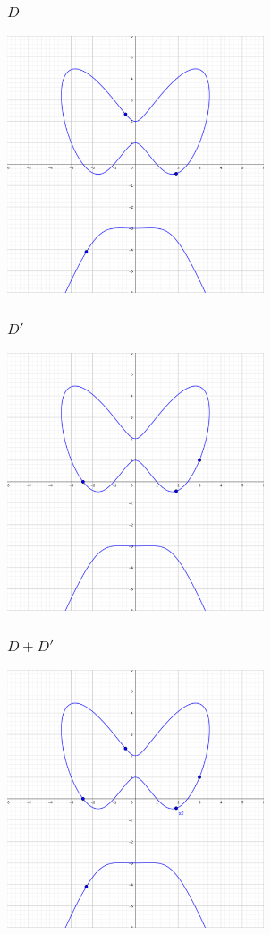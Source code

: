 \documentclass{beamer}
\begin{document}
\begin{frame}
\frametitle{$D$}
  \begin{center} \includegraphics[height=7.6cm]{d1.png} \end{center}
\end{frame}
\begin{frame}
\frametitle{$D'$}
  \begin{center} \includegraphics[height=7.6cm]{d2.png} \end{center}
\end{frame}
\begin{frame}
\frametitle{$D + D'$}
  \begin{center} \includegraphics[height=7.6cm]{d1_d2.png} \end{center}
\end{frame}
\end{document}
